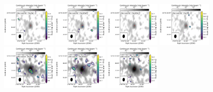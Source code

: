 \begin{figure}[htbp!]
  \centering
  \includegraphics[width=0.24\textwidth]{./moment0/Set3_ID08_2_CH3OH_243915.pdf}
  \includegraphics[width=0.24\textwidth]{./moment0/Set3_ID08_2_CH3OCHO_259342.pdf}
  \includegraphics[width=0.24\textwidth]{./moment0/Set3_ID08_2_CH3OCH3_259311.pdf}
  \includegraphics[width=0.24\textwidth]{./moment0/Set3_ID08_2_CH3CN_257527.pdf}
  \\
  \includegraphics[width=0.24\textwidth]{./moment0/Set3_ID08_CH3OH_243915.pdf}
  \includegraphics[width=0.24\textwidth]{./moment0/Set3_ID08_CH3OCHO_259342.pdf}
  \includegraphics[width=0.24\textwidth]{./moment0/Set3_ID08_CH3OCH3_259311.pdf}

\end{figure}
